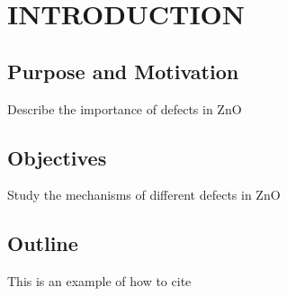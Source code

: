 \chapter{INTRODUCTION}
\section{Purpose and Motivation}
Describe the importance of defects in ZnO
\section{Objectives}
Study the mechanisms of different defects in ZnO
\section{Outline}

This is an example of how to cite \citep{Prades2009}
